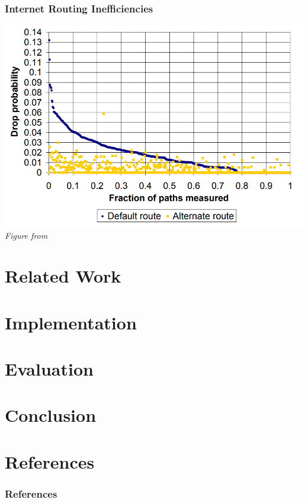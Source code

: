 \documentclass{beamer}
\begin{document}
\begin{frame}
  \frametitle{Internet Routing Inefficiencies}

  \includegraphics[height=0.85\textheight]{figures/detour-packetloss.png} \\
  \textit{Figure from \cite{detour}}
\end{frame}

\section{Related Work}
\section{Implementation}
\section{Evaluation}
\section{Conclusion}

\appendix %

\section{References}
\begin{frame}[allowframebreaks]
  \frametitle{References}
  
  
\end{frame}
\end{document}
